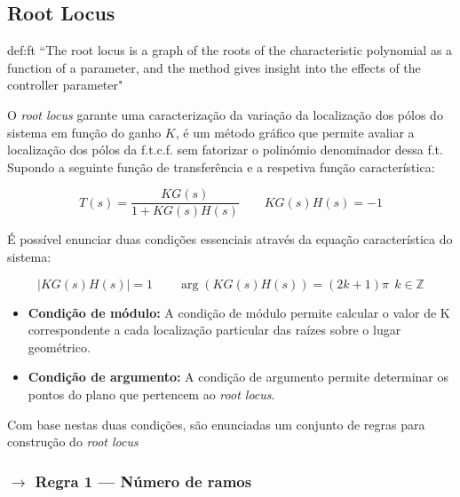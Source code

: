 \newpage
\subsection[3.3 Root Locus ]{\hspace*{0.075 em}\raisebox{0.2 em}{$\pmb{\drsh}$} Root Locus}

\begin{theo}{def:ft}\label{def:root-locus}
    \noindent ``The root locus is a graph of the roots of the characteristic polynomial as a function of a parameter, and the method gives insight into the effects of the controller parameter"\cite{medeiros:FSAISE}
\end{theo}

\noindent O \textit{root locus} garante uma caracterização da variação da localização dos pólos do sistema em função do ganho $K$, é um método gráfico que permite avaliar a localização dos pólos da f.t.c.f. sem fatorizar o polinómio denominador dessa f.t. Supondo a seguinte função de transferência e a respetiva função característica:

$$
    T(s) = \dfrac{KG(s)}{1 + KG(s)H(s)}\qquad
    KG(s)H(s) = -1
$$

\noindent É possível enunciar duas condições essenciais através da equação característica do sistema:

$$
    |KG(s)H(s)| = 1\qquad
    \arg(KG(s)H(s)) = (2k + 1)\pi\;\, k \in \mathbb{Z}
$$

\begin{itemize}
    \item \textbf{Condição de módulo:} A condição de módulo permite calcular o valor de K correspondente a cada localização particular das raízes sobre o lugar geométrico.
    \item \textbf{Condição de argumento:} A condição de argumento permite determinar os pontos do plano que pertencem ao \textit{root locus}.
\end{itemize}

\noindent Com base nestas duas condições, são enunciadas um conjunto de regras para construção do \textit{root locus}

\subsubsection[3.3.1 Regra 1 --- Número de ramos]{$\pmb{\rightarrow}$ Regra 1 --- Número de ramos}

